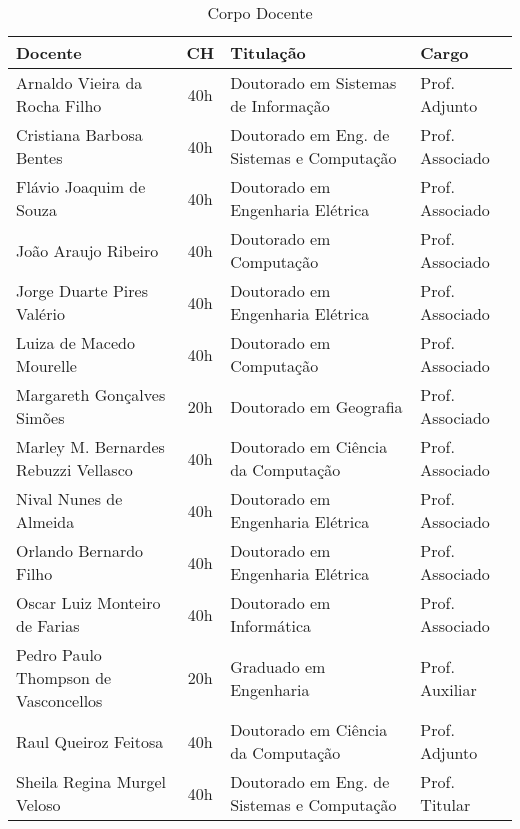 \begin{table}
\centering
\caption{Corpo Docente}
\label{CorpoDocente}
\begin{tabular}{|l|c|l|l|}
\hline
{\textbf{Docente}} & \textbf{CH} & \textbf{Titulação} &\textbf{Cargo} \\
\hline
Arnaldo Vieira da Rocha Filho & 40h & Doutorado em Sistemas de Informação & Prof. Adjunto \\
Cristiana Barbosa Bentes & 40h & Doutorado em Eng. de Sistemas e Computação & Prof. Associado \\
Flávio Joaquim de Souza & 40h & Doutorado em Engenharia Elétrica & Prof. Associado \\
João Araujo Ribeiro & 40h & Doutorado em Computação & Prof. Associado \\
Jorge Duarte Pires Valério & 40h & Doutorado em Engenharia Elétrica & Prof. Associado \\
Luiza de Macedo Mourelle & 40h & Doutorado em Computação & Prof. Associado \\
Margareth Gonçalves Simões & 20h & Doutorado em Geografia & Prof. Associado \\
Marley M. Bernardes Rebuzzi Vellasco & 40h & Doutorado em Ciência da Computação & Prof. Associado \\
Nival Nunes de Almeida & 40h & Doutorado em Engenharia Elétrica & Prof. Associado \\
Orlando Bernardo Filho & 40h & Doutorado em Engenharia Elétrica & Prof. Associado \\
Oscar Luiz Monteiro de Farias & 40h & Doutorado em Informática & Prof. Associado \\
Pedro Paulo Thompson de Vasconcellos & 20h & Graduado em Engenharia & Prof. Auxiliar \\
Raul Queiroz Feitosa & 40h & Doutorado em Ciência da Computação & Prof. Adjunto \\
Sheila Regina Murgel Veloso & 40h & Doutorado em Eng. de Sistemas e Computação & Prof. Titular \\
\hline
\end{tabular}
\end{table}






